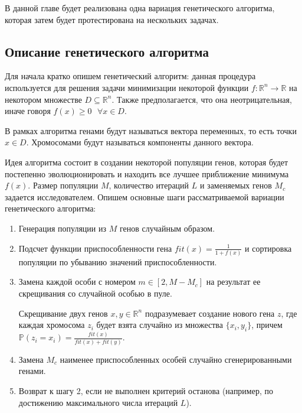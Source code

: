 \documentclass[../main.tex]{subfiles}
\begin{document}
	
	В данной главе будет реализована одна вариация генетического алгоритма, которая затем будет протестирована на нескольких задачах. 
	
	\subsection{Описание генетического алгоритма}
	
	Для начала кратко опишем генетический алгоритм: данная процедура используется для решения задачи минимизации некоторой функции $f: \mathbb{R}^n \rightarrow \mathbb{R}$ на некотором множестве $D \subseteq \mathbb{R}^n$. Также предполагается, что она неотрицательная, иначе говоря $f(x) \geqslant 0 \text{ }\forall x \in D$. 
	
	В рамках алгоритма генами будут называться вектора переменных, то есть точки $x \in D$. Хромосомами будут называться компоненты данного вектора. 
	
	Идея алгоритма состоит в создании некоторой популяции генов, которая будет постепенно эволюционировать и находить все лучшее приближение минимума $f(x)$. Размер популяции $M$, количество итераций $L$ и заменяемых генов $M_c$ задается исследователем.  Опишем основные шаги рассматриваемой вариации генетического алгоритма:
	
	\begin{enumerate}
		\item Генерация популяции из $M$ генов случайным образом.
		\item Подсчет функции приспособленности гена $fit(x) = \frac{1}{1 + f(x)}$ и сортировка популяции по убыванию значений приспособленности.
		\item Замена каждой особи с номером $m \in [2, M - M_c]$ на результат ее скрещивания со случайной особью в пуле. 
		
		Скрещивание двух генов $x, y \in \mathbb{R}^n$ подразумевает создание нового гена $z$, где каждая хромосома $z_i$ будет взята случайно из множества $\{x_i, y_i\}$, причем $\mathbb{P}(z_i = x_i) = \frac{fit(x)}{fit(x) + fit(y)}$.
		
		\item Замена $M_c$ наименее приспособленных особей случайно сгенерированными генами.
		\item Возврат к шагу 2, если не выполнен критерий останова (например, по достижению максимального числа итераций $L$).
		
	\end{enumerate}
\end{document}
